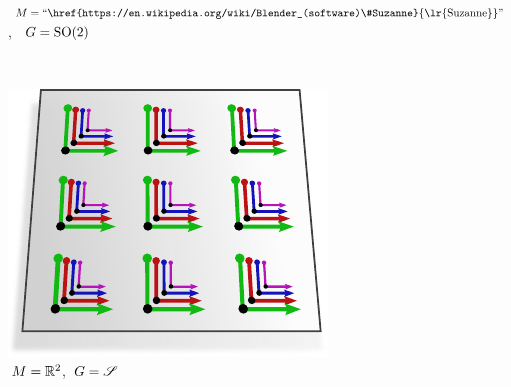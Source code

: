\hfill
\begin{subfigure}[b]{0.26\textwidth}
	\centering
	\vspace*{-3.ex}
	\captionsetup{format=hang, width=1.1\textwidth}
	\caption{\small
		$M = \textup{``\href{https://en.wikipedia.org/wiki/Blender_(software)\#Suzanne}{\lr{Suzanne}}''}$\!,
		\ $G = \operatorname{SO}(2)$
	}
	\label{fig:G_structure_intro_i}
\end{subfigure}
\\[2ex]
%
%
%
%
\begin{subfigure}[b]{0.26\textwidth}
	\centering
	\includegraphics[width=1.\textwidth]{figures/G_structure_R2_4_big.pdf}
	\captionsetup{format=hang}
	\caption{\small
		\,$M = \mathbb{R}^2$,
		\,$G = \mathscr{S}$
	}
	\label{fig:G_structure_intro_j}
\end{subfigure}
